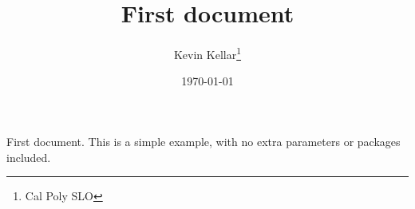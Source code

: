 \documentclass[12pt, letterpape, margin=1in]{article}
\title{First document}
\author{Kevin Kellar\thanks{Cal Poly SLO}}
\date{\today}
\begin{document}
\maketitle

First document. This is a simple example, with no 
extra parameters or packages included.
\end{document}
